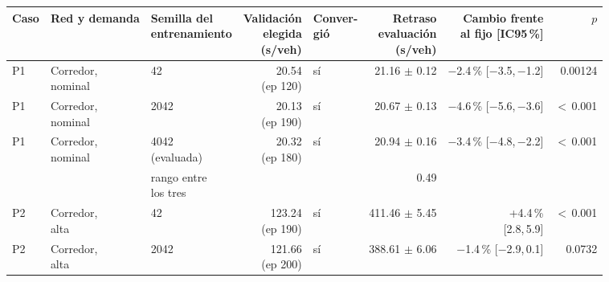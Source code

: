 \begin{table}[H]
\centering
\scriptsize
\setlength{\tabcolsep}{3pt}
\begin{tabular}{lllrlrrr}
\toprule
Caso & Red y demanda & \makecell{Semilla del\\entrenamiento} & \makecell{Validación\\elegida\\(s/veh)} & \makecell{Conver-\\gió} & \makecell{Retraso\\evaluación\\(s/veh)} & \makecell{Cambio frente\\al fijo [IC95\,\%]} & $p$ \\
\midrule
P1 & \makecell[l]{Corredor,\\{}nominal} & 42 & \makecell[r]{20.54\\{}(ep 120)} & sí & \makecell[r]{21.16\\{}$\pm$ 0.12} & \makecell[r]{$-$2.4\,\%\\{}[$-$3.5,\,$-$1.2]} & 0.00124 \\
P1 & \makecell[l]{Corredor,\\{}nominal} & 2042 & \makecell[r]{20.13\\{}(ep 190)} & sí & \makecell[r]{20.67\\{}$\pm$ 0.13} & \makecell[r]{$-$4.6\,\%\\{}[$-$5.6,\,$-$3.6]} & $<$\,0.001 \\
P1 & \makecell[l]{Corredor,\\{}nominal} & \makecell[l]{4042\\{}(evaluada)} & \makecell[r]{20.32\\{}(ep 180)} & sí & \makecell[r]{20.94\\{}$\pm$ 0.16} & \makecell[r]{$-$3.4\,\%\\{}[$-$4.8,\,$-$2.2]} & $<$\,0.001 \\
 & & \makecell[l]{rango entre\\{}los tres} & & & 0.49 & & \\
P2 & \makecell[l]{Corredor,\\{}alta} & 42 & \makecell[r]{123.24\\{}(ep 190)} & sí & \makecell[r]{411.46\\{}$\pm$ 5.45} & \makecell[r]{+4.4\,\%\\{}[2.8,\,5.9]} & $<$\,0.001 \\
P2 & \makecell[l]{Corredor,\\{}alta} & 2042 & \makecell[r]{121.66\\{}(ep 200)} & sí & \makecell[r]{388.61\\{}$\pm$ 6.06} & \makecell[r]{$-$1.4\,\%\\{}[$-$2.9,\,0.1]} & 0.0732 \\

\end{tabular}
\end{table}
